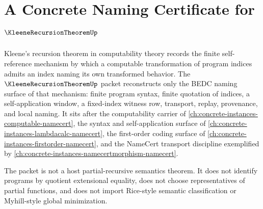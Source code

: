 \chapter{A Concrete Naming Certificate for $\KleeneRecursionTheoremUp$}
\label{ch:concrete-instances-kleene-recursion-theorem-namecert}

Kleene's recursion theorem in computability theory records the finite self-reference mechanism by which a computable transformation of program indices admits an index naming its own transformed behavior. The $\KleeneRecursionTheoremUp$ packet reconstructs only the BEDC naming surface of that mechanism: finite program syntax, finite quotation of indices, a self-application window, a fixed-index witness row, transport, replay, provenance, and local naming. It sits after the computability carrier of \autoref{ch:concrete-instances-computable-namecert}, the syntax and self-application surface of \autoref{ch:concrete-instances-lambdacalc-namecert}, the first-order coding surface of \autoref{ch:concrete-instances-firstorder-namecert}, and the NameCert transport discipline exemplified by \autoref{ch:concrete-instances-namecertmorphism-namecert}.

The packet is not a host partial-recursive semantics theorem. It does not identify programs by quotient extensional equality, does not choose representatives of partial functions, and does not import Rice-style semantic classification or Myhill-style global minimization.

